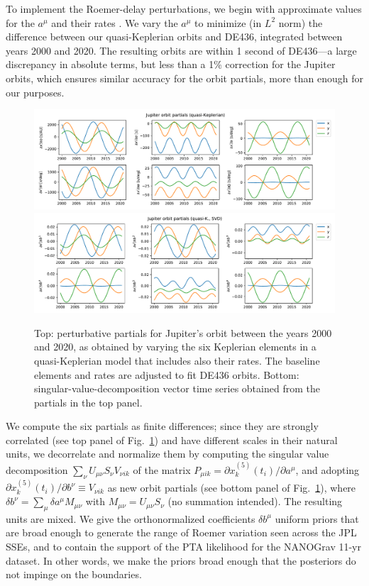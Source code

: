 \documentclass[reprint,
 amsmath,amssymb,
 aps,prd,floatfix,
]{revtex4-1}
\begin{document}
\begin{itemize}[leftmargin=*]
To implement the Roemer-delay perturbations, we begin with approximate values for the $a^\mu$ and their rates \cite{ssdelements}. We vary the $a^\mu$ to minimize (in $L^2$ norm) the difference between our quasi-Keplerian orbits and DE436, integrated between years 2000 and 2020. The resulting orbits are within 1 second of DE436---a large discrepancy in absolute terms, but less than a 1\% correction for the Jupiter orbits, which ensures similar accuracy for the orbit partials, more than enough for our purposes.
%
\begin{figure}[t]
    \centering
    \includegraphics[width=2\columnwidth]{figures/JupiterPartials.pdf}
    \includegraphics[width=2\columnwidth]{figures/JupiterPartialsSVD.pdf}
    \caption{Top: perturbative partials for Jupiter's orbit between the years 2000 and 2020, as obtained by varying the six Keplerian elements in a quasi-Keplerian model that includes also their rates. The baseline elements and rates are adjusted to fit DE436 orbits. Bottom: singular-value-decomposition vector time series obtained from the partials in the top panel.}
    \label{fig:jupiterorbit}
\end{figure}

We compute the six partials as finite differences; since they are strongly correlated (see top panel of Fig.\ \ref{fig:jupiterorbit}) and have different scales in their natural units, we decorrelate and normalize them by computing the singular value decomposition $\sum_\nu U_{\mu\nu} S_\nu V_{\nu i k}$ of the matrix $P_{\mu i k} = \partial x^{(5)}_k(t_i)/\partial a^\mu$, and adopting $\partial x^{(5)}_k(t_i)/\partial b^\nu \equiv V_{\nu i k}$ as new orbit partials (see bottom panel of Fig.\ \ref{fig:jupiterorbit}), where $\delta b^\nu = \sum_\mu \delta a^\mu M_{\mu \nu}$ with $M_{\mu \nu} = U_{\mu\nu} S_\nu$ (no summation intended). The resulting units are mixed. We give the orthonormalized coefficients $\delta b^\mu$ uniform priors that are broad enough to generate the range of Roemer variation seen across the JPL SSEs, and to contain the support of the PTA likelihood for the NANOGrav 11-yr dataset. In other words, we make the priors broad enough that the posteriors do not impinge on the boundaries.


\end{itemize}
\end{document}
